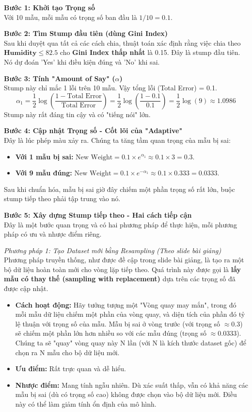 \textbf{Bước 1: Khởi tạo Trọng số} \\
Với 10 mẫu, mỗi mẫu có trọng số ban đầu là $1/10 = 0.1$.

\textbf{Bước 2: Tìm Stump đầu tiên (dùng Gini Index)} \\
Sau khi duyệt qua tất cả các cách chia, thuật toán xác định rằng việc chia theo $\textbf{Humidity} \leq 82.5$ cho \textbf{Gini Index thấp nhất} là 0.15. Đây là stump đầu tiên. Nó dự đoán 'Yes' khi điều kiện đúng và 'No' khi sai.

\textbf{Bước 3: Tính "Amount of Say" ($\alpha$)} \\
Stump này chỉ mắc 1 lỗi trên 10 mẫu. Vậy tổng lỗi (Total Error) = 0.1.
\[
\alpha_1 = \frac{1}{2} \log\left(\frac{1 - \text{Total Error}}{\text{Total Error}}\right) = \frac{1}{2} \log\left(\frac{1 - 0.1}{0.1}\right) = \frac{1}{2} \log(9) \approx 1.0986
\]
Stump này rất đáng tin cậy và có "tiếng nói" lớn.

\textbf{Bước 4: Cập nhật Trọng số - Cốt lõi của "Adaptive"} \\
Đây là lúc phép màu xảy ra. Chúng ta tăng tầm quan trọng của mẫu bị sai:
\begin{itemize}
    \item \textbf{Với 1 mẫu bị sai:} $\text{New Weight} = 0.1 \times e^{\alpha_1} \approx 0.1 \times 3 = 0.3$.
    \item \textbf{Với 9 mẫu đúng:} $\text{New Weight} = 0.1 \times e^{-\alpha_1} \approx 0.1 \times 0.333 = 0.0333$.
\end{itemize}
Sau khi chuẩn hóa, mẫu bị sai giờ đây chiếm một phần trọng số rất lớn, buộc stump tiếp theo phải tập trung vào nó. 

\textbf{Bước 5: Xây dựng Stump tiếp theo - Hai cách tiếp cận} \\
Đây là một bước quan trọng và có hai phương pháp để thực hiện, mỗi phương pháp có ưu và nhược điểm riêng.

\textit{Phương pháp 1: Tạo Dataset mới bằng Resampling (Theo slide bài giảng)} \\
Phương pháp truyền thống, như được đề cập trong slide bài giảng, là tạo ra một bộ dữ liệu hoàn toàn mới cho vòng lặp tiếp theo. Quá trình này được gọi là \textbf{lấy mẫu có thay thế (sampling with replacement)} dựa trên các trọng số đã được cập nhật.
\begin{itemize}
    \item \textbf{Cách hoạt động:} Hãy tưởng tượng một "Vòng quay may mắn", trong đó mỗi mẫu dữ liệu chiếm một phần của vòng quay, và diện tích của phần đó tỷ lệ thuận với trọng số của mẫu. Mẫu bị sai ở vòng trước (với trọng số $\approx 0.3$) sẽ chiếm một phần lớn hơn nhiều so với các mẫu đúng (trọng số $\approx 0.0333$). Chúng ta sẽ "quay" vòng quay này N lần (với N là kích thước dataset gốc) để chọn ra N mẫu cho bộ dữ liệu mới.
    \item \textbf{Ưu điểm:} Rất trực quan và dễ hiểu.
    \item \textbf{Nhược điểm:} Mang tính ngẫu nhiên. Dù xác suất thấp, vẫn có khả năng các mẫu bị sai (dù có trọng số cao) không được chọn vào bộ dữ liệu mới. Điều này có thể làm giảm tính ổn định của mô hình.
\end{itemize}

